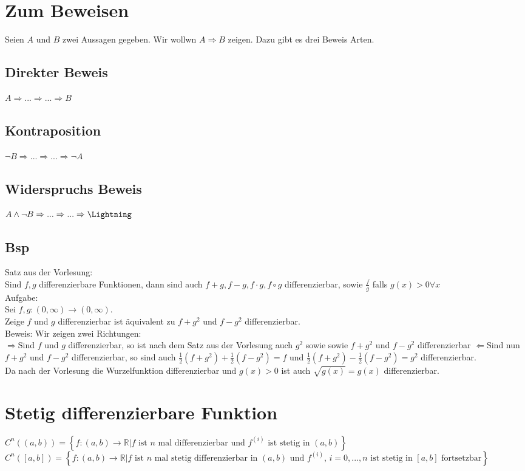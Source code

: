 \documentclass[11pt,a4paper]{article}
\begin{document}
  \section*{Zum Beweisen}
    Seien $A$ und $B$ zwei Aussagen gegeben. Wir wollwn $A \Rightarrow B$ zeigen. Dazu gibt es drei Beweis Arten.\\
    \subsection*{Direkter Beweis}
      $A \Rightarrow ... \Rightarrow ... \Rightarrow B$
    \subsection*{Kontraposition}
      $\neg B \Rightarrow ... \Rightarrow ... \Rightarrow \neg A$
    \subsection*{Widerspruchs Beweis}
      $A \wedge \neg B \Rightarrow ... \Rightarrow ... \Rightarrow \text{\Lightning}$
    \subsection{Bsp}
      Satz aus der Vorlesung:\\
        Sind $f,g$ differenzierbare Funktionen, dann sind auch $f+g,f-g,f \cdot g, f \circ g$ differenzierbar, sowie $\frac{f}{g}$ falls $g(x)>0 \forall x$\\
      Aufgabe:\\
        Sei $f,g:(0,\infty)\to(0,\infty)$.\\
        Zeige $f$ und $g$ differenzierbar ist äquivalent zu $f+g^2$ und $f-g^2$ differenzierbar.\\
      Beweis: Wir zeigen zwei Richtungen:\\
        \glqq$\Rightarrow$\grqq Sind $f$ und $g$ differenzierbar, so ist nach dem Satz aus der Vorlesung auch $g^2$ sowie sowie $f+g^2$ und $f-g^2$ differenzierbar \glqq$\Leftarrow$\grqq Sind nun $f+g^2$ und $f-g^2$ differenzierbar, so sind auch $\frac{1}{2}\left(f+g^2 \right)+\frac{1}{2}\left(f-g^2\right)=f$ und $\frac{1}{2}\left( f+g^2 \right)- \frac{1}{2}\left( f-g^2 \right)=g^2$ differenzierbar.\\
        Da nach der Vorlesung die Wurzelfunktion differenzierbar und $g\left( x \right)>0$ ist auch $\sqrt{g\left( x\right)} = g\left( x \right)$ differenzierbar.
  \section*{Stetig differenzierbare Funktion}
    $C^n\left( \left( a,b \right) \right)=\left\lbrace f:\left(a,b\right) \to \mathbb{R} | \text{$f$ ist $n$ mal differenzierbar und $f^{\left( i\right)}$ ist stetig in $\left( a,b \right)$}\right\rbrace$\\
    $C^n\left( \left[ a,b \right]\right)=\left\lbrace f:\left(a,b\right) \to \mathbb{R} | \text{$f$ ist $n$ mal stetig differenzierbar in $\left( a,b \right)$ und $f^{ \left( i\right) }$, $i=0,...,n$ ist stetig in $\left[ a,b \right] $ fortsetzbar}\right\rbrace$
    \newpage
\end{document}
